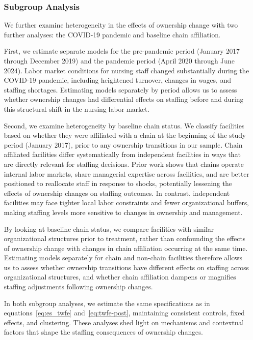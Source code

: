 \documentclass[preprint,authoryear]{elsarticle}
\begin{document}
\subsubsection{Subgroup Analysis}

We further examine heterogeneity in the effects of ownership change with two further analyses: the COVID-19 pandemic and baseline chain affiliation.

First, we estimate separate models for the pre-pandemic period (January 2017 through December 2019) and the pandemic period (April 2020 through June 2024). Labor market conditions for nursing staff changed substantially during the COVID-19 pandemic, including heightened turnover, changes in wages, and staffing shortages. Estimating models separately by period allows us to assess whether ownership changes had differential effects on staffing before and during this structural shift in the nursing labor market.

Second, we examine heterogeneity by baseline chain status. We classify facilities based on whether they were affiliated with a chain at the beginning of the study period (January 2017), prior to any ownership transitions in our sample. Chain affiliated facilities differ systematically from independent facilities in ways that are directly relevant for staffing decisions. Prior work shows that chains operate internal labor markets, share managerial expertise across facilities, and are better positioned to reallocate staff in response to shocks, potentially lessening the effects of ownership changes on staffing outcomes. In contrast, independent facilities may face tighter local labor constraints and fewer organizational buffers, making staffing levels more sensitive to changes in ownership and management.

By looking at baseline chain status, we compare facilities with similar organizational structures prior to treatment, rather than confounding the effects of ownership change with changes in chain affiliation occurring at the same time. Estimating models separately for chain and non-chain facilities therefore allows us to assess whether ownership transitions have different effects on staffing across organizational structures, and whether chain affiliation dampens or magnifies staffing adjustments following ownership changes.

In both subgroup analyses, we estimate the same specifications as in equations~\eqref{eq:es_twfe} and~\eqref{eq:twfe-post}, maintaining consistent controls, fixed effects, and clustering. These analyses shed light on mechanisms and contextual factors that shape the staffing consequences of ownership changes.
\end{document}
